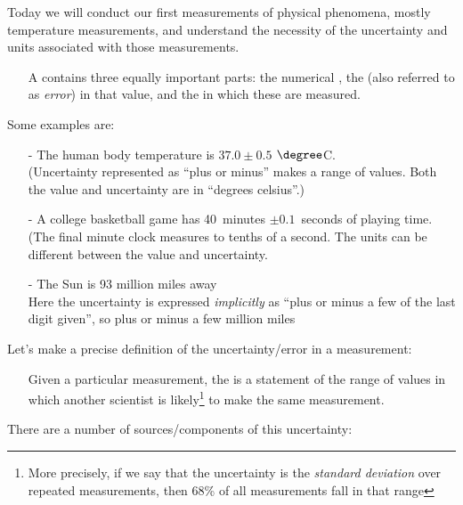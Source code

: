 Today we will conduct our first measurements of physical phenomena, mostly temperature measurements, and understand the necessity of the uncertainty and units associated with those measurements.
	\begin{itemize} 
	\item[] A  contains three equally important parts: the numerical , the  (also referred to as {\em error}) in that value, and the  in which these are measured.
	\end{itemize}
Some examples are:
	\begin{itemize}
	\item[-] The human body temperature is $37.0 \pm 0.5$ $\degree$C.\\
	{\small (Uncertainty represented as ``plus or minus'' makes a range of values. Both the value and uncertainty are in ``degrees celsius''.)}
	\item[-] A college basketball game has 40~minutes $\pm 0.1$~seconds of playing time.\\
	{\small (The final minute clock measures to tenths of a second. The units can be different between the value and uncertainty.}
	\item[-] The Sun is 93 million miles away\\
	{\small Here the uncertainty is expressed {\em implicitly} as ``plus or minus a few of the last digit given'', so plus or minus a few million miles}
	\end{itemize}
Let's make a precise definition of the uncertainty/error in a measurement:
	\begin{itemize}
	\item[] Given a particular measurement, the  is a statement of the range of values in which another scientist is likely\footnote{More precisely, if we say that the uncertainty is the {\em standard deviation} over repeated measurements, then 68\% of all measurements fall in that range} to make the same measurement.
	\end{itemize}
There are a number of sources/components of this uncertainty:
